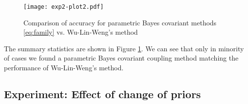 \begin{figure}[!ht]
\texttt{[image: exp2-plot2.pdf]}
\caption{Comparison of accuracy for parametric Bayes covariant methods \eqref{eq:family} vs. Wu-Lin-Weng's method}
\label{fig:par-bc}
\end{figure}

The summary statistics are shown in Figure \ref{fig:par-bc}.
We can see that only in minority of cases we found a parametric Bayes covariant coupling method matching the performance of Wu-Lin-Weng's method. 

%
%
%
%
%
%
%
%

\subsection{Experiment: Effect of change of priors}  \label{sec:exp4}

